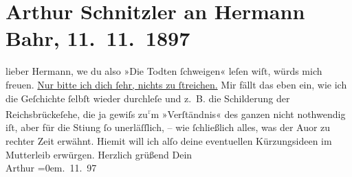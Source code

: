 

         
         \renewcommand{\erwaehntePersonen}{Personen: Hermann Bahr}
         \renewcommand{\erwaehnteOrte}{Orte: Reichsbrücke, Wien}
         \renewcommand{\erwaehnteWerke}{Werke: Die Toten schweigen}
               \section[Arthur Schnitzler an Hermann Bahr, 11. 11. 1897]{ Arthur Schnitzler an Hermann Bahr, 11. 11. 1897}\nopagebreak{}\rehead{ }\begin{ledgroupsized}[t]{13cm}\normalsize\beginnumbering \toendnotes[C]{\smallbreak\pagebreak[2]} 
\pstart
           \noindent{}{\pb}lieber Hermann, we{\geminationn} du also »Die Todten ſchweigen« leſen wiſt, würds mich freuen. \uline{Nur bitte ich dich ſehr,
                  nichts zu ſtreichen.} Mir fällt das eben ein, wie ich die Geſchichte ſelbſt
               wieder durchleſe und z. B. die Schilderung der Reichsbrückeſehe, die ja gewiſs zu\substVorne{}\textsuperscript{\textcolor{gray}{r}}\substDazwischen{}m\substHinten{} »Verſtändnis« des ganzen \introOben{}nicht\introOben{} nothwendig iſt, aber
               für die Sti{\geminationm}ung {\pb}ſo
               unerläſſlich, – wie ſchließlich alles, was der Auor zu rechter Zeit erwähnt. Hiemit will ich alſo deine eventuellen
               Kürzungsideen im Mutterleib erwürgen.\pend
           \pstart
           Herzlich grüßend Dein{\\[\baselineskip]}\spacefill\mbox{Arthur}\pend
           \leftskip=0em{}. 11. 97\pend
           
         
         \endnumbering{}\end{ledgroupsized}  \newcommand{\dateiname}{L00738}\newcommand{\titel}{Arthur Schnitzler an Hermann Bahr, 11. 11. 1897}\newcommand{\editorInnen}{ Kurt Ifkovits,  Martin Anton Müller}
      